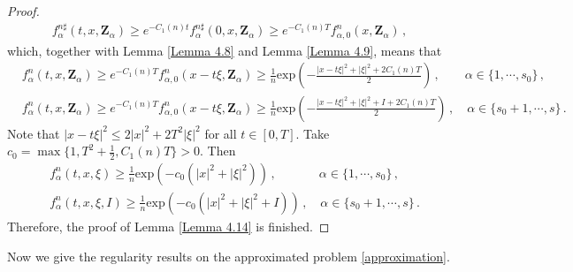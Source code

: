 \documentclass[reqno,11pt]{amsart}
\numberwithin{equation}{section}
\def\exp{\mathrm{exp}}
\begin{document}
\begin{proof}
\begin{equation*}
\begin{aligned}
    f^{n\sharp}_\alpha (t, x, \mathbf{Z}_\alpha) \geq e^{-C_1 (n) t} f^{n\sharp}_\alpha (0, x, \mathbf{Z}_\alpha) \geq e^{-C_1 (n) T }f_{\alpha, 0}^n (x, \mathbf{Z}_\alpha) \,,
  \end{aligned}
\end{equation*}
which, together with Lemma \ref{Lemma 4.8} and Lemma \ref{Lemma 4.9}, means that
\begin{equation*}
  \begin{aligned}
    & f^n_\alpha (t,x, \mathbf{Z}_\alpha) \geq e^{-C_1 (n) T } f_{\alpha, 0}^n (x - t \xi, \mathbf{Z}_\alpha) \geq \tfrac{1}{n} \exp ( - \tfrac{|x - t \xi|^2 + |\xi|^2 + 2C_1 (n) T }{2} ) \,, \qquad \alpha \in \{ 1, \cdots, s_0 \} \,, \\ 
    & f^n_\alpha (t,x, \mathbf{Z}_\alpha) \geq e^{-C_1 (n) T }  f_{\alpha, 0}^n (x - t \xi, \mathbf{Z}_\alpha) \geq \tfrac{1}{n} \exp ( - \tfrac{|x - t \xi|^2 + |\xi|^2 + I + 2 C_1 (n) T}{2} ) \,, \quad \alpha \in \{ s_0 + 1, \cdots, s \} \,.
  \end{aligned}
\end{equation*}
Note that $ |x - t \xi|^2 \leq 2 |x|^2 +  2 T^2  |\xi|^2 $ for all $t \in [0, T]$. Take $c_0 = \max \{ 1, T^2 +  \frac{1}{2}, C_1 (n) T \} > 0 $. Then
\begin{equation*}
  \begin{aligned}
    & f^n_\alpha (t,x, \xi) \geq \tfrac{1}{n} \exp ( - c_0 (|x|^2 + |\xi|^2) ) \,, \qquad \quad \ \ \alpha \in \{ 1, \cdots, s_0 \} \,, \\ 
    & f^n_\alpha (t,x, \xi, I) \geq \tfrac{1}{n} \exp ( - c_0 (|x|^2 + |\xi|^2 + I) ) \,, \quad \alpha \in \{ s_0 + 1, \cdots, s \} \,.
  \end{aligned}
\end{equation*}
Therefore, the proof of Lemma \ref{Lemma 4.14} is finished.
\end{proof}

Now we give the regularity results on the approximated problem \eqref{approximation}.
\end{document}
